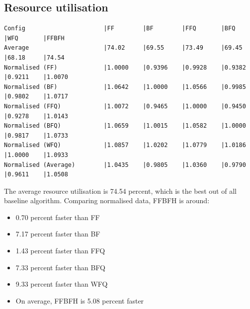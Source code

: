 \documentclass[a4paper]{article} %
\begin{document}
\subsection{Resource utilisation}
\begin{lstlisting}
Config                      |FF        |BF        |FFQ       |BFQ       |WFQ       |FFBFH
Average                     |74.02     |69.55     |73.49     |69.45     |68.18     |74.54     
Normalised (FF)             |1.0000    |0.9396    |0.9928    |0.9382    |0.9211    |1.0070    
Normalised (BF)             |1.0642    |1.0000    |1.0566    |0.9985    |0.9802    |1.0717    
Normalised (FFQ)            |1.0072    |0.9465    |1.0000    |0.9450    |0.9278    |1.0143    
Normalised (BFQ)            |1.0659    |1.0015    |1.0582    |1.0000    |0.9817    |1.0733    
Normalised (WFQ)            |1.0857    |1.0202    |1.0779    |1.0186    |1.0000    |1.0933    
Normalised (Average)        |1.0435    |0.9805    |1.0360    |0.9790    |0.9611    |1.0508   
\end{lstlisting}
The average resource utilisation is 74.54 percent, which is the best out of all baseline algorithm. Comparing normalised data, FFBFH is around:
\begin{itemize}
    \item 0.70 percent faster than FF
    \item 7.17 percent faster than BF
    \item 1.43 percent faster than FFQ
    \item 7.33 percent faster than BFQ
    \item 9.33 percent faster than WFQ
    \item On average, FFBFH is 5.08 percent faster
\end{itemize}
\end{document}

